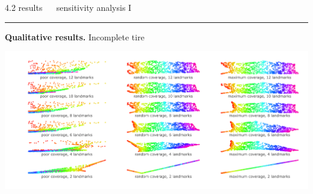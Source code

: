 \documentclass[11pt, compress, t, notes = noshow, xcolor = table, 
aspectratio = 1610]{beamer}
\begin{document}

\LARGE
\begin{frame}{\textcolor{gray!90}{4.2 results} ~~ sensitivity analysis I}
\normalsize
\vspace{-0.5cm}
\noindent \textcolor{gray!90}{\rule{\textwidth}{1pt}}
\smallskip

\textbf{Qualitative results.} Incomplete tire

\vspace{0.3cm}

\includegraphics[trim = 40 10 0 0, clip, %
    width = \textwidth]{figures/sensitivity_landmarks_qual_tire}

\end{frame}

\end{document}
